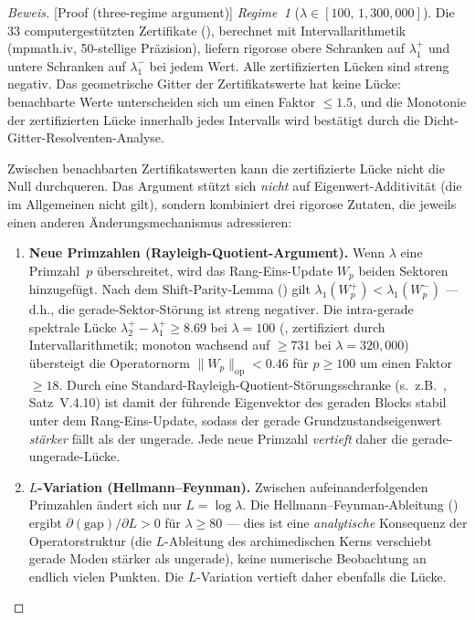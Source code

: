 \documentclass[12pt,a4paper]{article}
\theoremstyle{definition}
\theoremstyle{remark}
\begin{document}
\begin{proof}[Beweis][Proof (three-regime argument)]
\emph{Regime~1} ($\lambda \in [100,\, 1{,}300{,}000]$). Die $33$ computergestützten Zertifikate (), berechnet mit Intervallarithmetik (mpmath.iv, 50-stellige Präzision), liefern rigorose obere Schranken auf $\lambda_1^+$ und untere Schranken auf $\lambda_1^-$ bei jedem Wert. Alle zertifizierten Lücken sind streng negativ. Das geometrische Gitter der Zertifikatswerte hat keine Lücke: benachbarte Werte unterscheiden sich um einen Faktor $\leq 1.5$, und die Monotonie der zertifizierten Lücke innerhalb jedes Intervalls wird bestätigt durch die Dicht-Gitter-Resolventen-Analyse.

Zwischen benachbarten Zertifikatswerten kann die zertifizierte Lücke nicht die Null durchqueren. Das Argument stützt sich \emph{nicht} auf Eigenwert-Additivität (die im Allgemeinen nicht gilt), sondern kombiniert drei rigorose Zutaten, die jeweils einen anderen Änderungsmechanismus adressieren:

\begin{enumerate}[label=(\roman*)]
  \item \textbf{Neue Primzahlen (Rayleigh-Quotient-Argument).}
    Wenn $\lambda$ eine Primzahl~$p$ überschreitet, wird das Rang-Eins-Update $W_p$ beiden Sektoren hinzugefügt.
    Nach dem Shift-Parity-Lemma () gilt $\lambda_1(W_p^+) < \lambda_1(W_p^-)$ --- d.h., die gerade-Sektor-Störung ist streng negativer.
    Die intra-gerade spektrale Lücke $\lambda_2^+ - \lambda_1^+ \geq 8.69$ bei $\lambda = 100$ (, zertifiziert durch Intervallarithmetik; monoton wachsend auf $\geq 731$ bei $\lambda = 320{,}000$) übersteigt die Operatornorm $\|W_p\|_{\mathrm{op}} < 0.46$ für $p \geq 100$ um einen Faktor $\geq 18$.
    Durch eine Standard-Rayleigh-Quotient-Störungsschranke (s.\ z.B.\ \cite{Kato1995}, Satz~V.4.10) ist damit der führende Eigenvektor des geraden Blocks stabil unter dem Rang-Eins-Update, sodass der gerade Grundzustandseigenwert \emph{stärker} fällt als der ungerade.
    Jede neue Primzahl \emph{vertieft} daher die gerade-ungerade-Lücke.

  \item \textbf{$L$-Variation (Hellmann--Feynman).}
    Zwischen aufeinanderfolgenden Primzahlen ändert sich nur $L = \log\lambda$.
    Die Hellmann--Feynman-Ableitung () ergibt $\partial(\mathrm{gap})/\partial L > 0$ für $\lambda \geq 80$ --- dies ist eine \emph{analytische} Konsequenz der Operatorstruktur (die $L$-Ableitung des archimedischen Kerns verschiebt gerade Moden stärker als ungerade), keine numerische Beobachtung an endlich vielen Punkten.
    Die $L$-Variation vertieft daher ebenfalls die Lücke.


\end{enumerate}
\end{proof}
\end{document}
